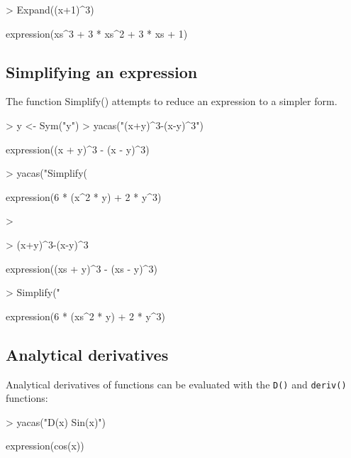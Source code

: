 \documentclass[]{article}
\newcommand{\code}[1]{{\tt #1}}
\begin{document}
\begin{Schunk}
\begin{Sinput}
> Expand((x+1)^3)
\end{Sinput}
\begin{Soutput}
expression(xs^3 + 3 * xs^2 + 3 * xs + 1)
\end{Soutput}
\end{Schunk}



\subsection{Simplifying an expression}

The function Simplify() attempts to reduce an expression
to a simpler form. 
\begin{Schunk}
\begin{Sinput}
> y <- Sym("y")
> yacas("(x+y)^3-(x-y)^3")
\end{Sinput}
\begin{Soutput}
expression((x + y)^3 - (x - y)^3)
\end{Soutput}
\begin{Sinput}
> yacas("Simplify(%)")
\end{Sinput}
\begin{Soutput}
expression(6 * (x^2 * y) + 2 * y^3)
\end{Soutput}
\begin{Sinput}
> 
\end{Sinput}
\end{Schunk}

\begin{Schunk}
\begin{Sinput}
> (x+y)^3-(x-y)^3
\end{Sinput}
\begin{Soutput}
expression((xs + y)^3 - (xs - y)^3)
\end{Soutput}
\begin{Sinput}
> Simplify("%")
\end{Sinput}
\begin{Soutput}
expression(6 * (xs^2 * y) + 2 * y^3)
\end{Soutput}
\end{Schunk}


\subsection{Analytical derivatives}

Analytical derivatives of functions can be evaluated with the
\code{D()} and \code{deriv()} functions:
\begin{Schunk}
\begin{Sinput}
> yacas("D(x) Sin(x)")
\end{Sinput}
\begin{Soutput}
expression(cos(x))
\end{Soutput}
\end{Schunk}
\end{document}
